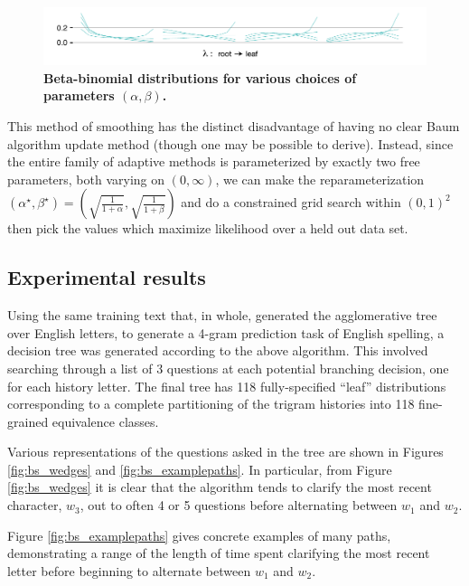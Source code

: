 \documentclass[12pt]{article}
\begin{document}
\begin{figure}
  \centering
  \includegraphics[width=\linewidth]{betabinom}
  \caption{\textbf{Beta-binomial distributions for various choices of
      parameters $(\alpha, \beta)$.}}
  \label{fig:betabinomial}
\end{figure}

This method of smoothing has the distinct disadvantage of having no
clear Baum algorithm update method (though one may be possible to
derive). Instead, since the entire family of adaptive methods is
parameterized by exactly two free parameters, both varying on $(0,
\infty)$, we can make the reparameterization $(\alpha^\star,
\beta^\star) = \left(\sqrt{\frac{1}{1+\alpha}},
  \sqrt{\frac{1}{1+\beta}}\right)$ and do a constrained grid search
within $(0,1)^2$ then pick the values which maximize likelihood over a
held out data set.

\subsection{Experimental results}

Using the same training text that, in whole, generated the
agglomerative tree over English letters, to generate a 4-gram
prediction task of English spelling, a decision tree was generated
according to the above algorithm. This involved searching through a
list of 3 questions at each potential branching decision, one for each
history letter. The final tree has 118 fully-specified ``leaf''
distributions corresponding to a complete partitioning of the trigram
histories into 118 fine-grained equivalence classes.

Various representations of the questions asked in the tree are shown
in Figures \ref{fig:bs_wedges} and \ref{fig:bs_examplepaths}. In
particular, from Figure \ref{fig:bs_wedges} it is clear that the
algorithm tends to clarify the most recent character, $w_3$, out to
often 4 or 5 questions before alternating between $w_1$ and $w_2$.

Figure \ref{fig:bs_examplepaths} gives concrete examples of many
paths, demonstrating a range of the length of time spent clarifying
the most recent letter before beginning to alternate between $w_1$ and
$w_2$.

\end{document}
